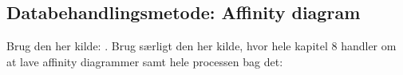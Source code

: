 \subsection{Databehandlingsmetode: Affinity diagram}
\label{ParametreMetodeovervejelserAffinityDiagram}
%
Brug den her kilde: \textcite[ss. 24-28]{PDF:ConsolidationIdeationAffinity}. Brug særligt den her kilde, hvor hele kapitel 8 handler om at lave affinity diagrammer samt hele processen bag det: \textcite[ss. 159-179]{Book:BuildingAnAffinity}
